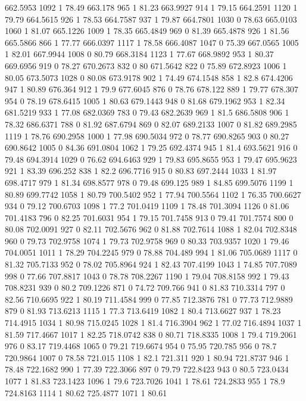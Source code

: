 662.5953	1092	1	78.49
663.178	965	1	81.23
663.9927	914	1	79.15
664.2591	1120	1	79.79
664.5615	926	1	78.53
664.7587	937	1	79.87
664.7801	1030	0	78.63
665.0103	1060	1	81.07
665.1226	1009	1	78.35
665.4849	969	0	81.39
665.4878	926	1	81.56
665.5866	866	1	77.77
666.0397	1117	1	78.58
666.4087	1047	0	75.39
667.0565	1005	1	82.01
667.9944	1008	0	80.79
668.3184	1123	1	77.67
668.9892	953	1	80.37
669.6956	919	0	78.27
670.2673	832	0	80
671.5642	822	0	75.89
672.8923	1006	1	80.05
673.5073	1028	0	80.08
673.9178	902	1	74.49
674.1548	858	1	82.8
674.4206	947	1	80.89
676.364	912	1	79.9
677.6045	876	0	78.76
678.122	889	1	79.77
678.307	954	0	78.19
678.6415	1005	1	80.63
679.1443	948	0	81.68
679.1962	953	1	82.34
681.5219	933	1	77.08
682.0369	783	0	79.43
682.2639	969	1	81.5
686.5808	906	1	78.32
686.6371	788	0	81.92
687.6794	869	0	82.07
689.2133	1007	0	81.82
689.2985	1119	1	78.76
690.2958	1000	1	77.98
690.5034	972	0	78.77
690.8265	903	0	80.27
690.8642	1005	0	84.36
691.0804	1062	1	79.25
692.4374	945	1	81.4
693.5621	916	0	79.48
694.3914	1029	0	76.62
694.6463	929	1	79.83
695.8655	953	1	79.47
695.9623	921	1	83.39
696.252	838	1	82.2
696.7716	915	0	80.83
697.2444	1033	1	81.97
698.4717	979	1	81.34
698.8577	978	0	79.48
699.125	989	1	84.85
699.5076	1199	1	80.89
699.7742	1058	1	80.79
700.5402	952	1	77.94
700.5564	1102	1	76.35
700.6627	934	0	79.12
700.6703	1098	1	77.2
701.0419	1109	1	78.48
701.3094	1126	0	81.06
701.4183	796	0	82.25
701.6031	954	1	79.15
701.7458	913	0	79.41
701.7574	800	0	80.08
702.0091	927	0	82.11
702.5676	962	0	81.88
702.7614	1088	1	82.04
702.8348	960	0	79.73
702.9758	1074	1	79.73
702.9758	969	0	80.33
703.9357	1020	1	79.46
704.0051	1011	1	78.29
704.2245	979	0	78.88
704.489	994	1	81.06
705.0689	1117	0	81.32
705.7133	952	0	78.02
705.8964	924	1	82.43
707.4199	1043	1	74.85
707.7089	998	0	77.66
707.8817	1043	0	78.78
708.2267	1190	1	79.04
708.8158	992	1	79.43
708.8231	939	0	80.2
709.1226	871	0	74.72
709.766	941	0	81.83
710.3314	797	0	82.56
710.6695	922	1	80.19
711.4584	999	0	77.85
712.3876	781	0	77.73
712.9889	879	0	81.93
713.6213	1115	1	77.3
713.6419	1082	1	80.4
713.6627	937	1	78.23
714.4915	1034	1	80.98
715.0245	1028	1	81.4
716.3904	962	1	77.02
716.4894	1037	1	81.59
717.4667	1017	1	82.25
718.0742	838	0	80.71
718.8335	1008	1	79.4
719.2061	976	0	83.17
719.4468	1065	0	79.21
719.6674	954	0	75.95
720.785	956	0	78.7
720.9864	1007	0	78.58
721.015	1108	1	82.1
721.311	920	1	80.94
721.8737	946	1	78.48
722.1682	990	1	77.39
722.3066	897	0	79.79
722.8423	943	0	80.5
723.0434	1077	1	81.83
723.1423	1096	1	79.6
723.7026	1041	1	78.61
724.2833	955	1	78.9
724.8163	1114	1	80.62
725.4877	1071	1	80.61

